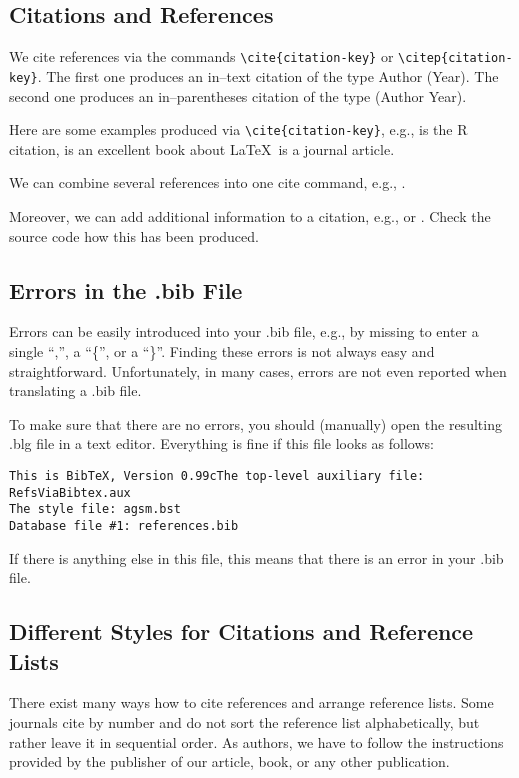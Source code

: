 \documentclass[12pt]{article}
\begin{document}
\subsection{Citations and References}

We cite references via the commands \verb|\cite{citation-key}|
or \verb|\citep{citation-key}|. The first one produces
an in--text citation of the type Author (Year). The second one
produces an in--parentheses citation of the type (Author Year).

Here are some examples produced via \verb|\cite{citation-key}|,
e.g., \cite{R} is the R citation,
\cite{Lamport85} is an excellent book about \LaTeX\, \cite{RF} is
a journal article.

We can combine several references into one cite command, e.g.,
\citep{R,Lamport85,RF}.

Moreover, we can add additional information to a citation, e.g.,
\citep[p.~5]{RF} or \citep[see for example][p.~5]{RF}.
Check the source code how this has been produced.

\subsection{Errors in the .bib File}

Errors can be easily introduced into your .bib file, e.g., by missing to
enter a single ``,'', a ``\{'', or a ``\}''. Finding these errors is not
always easy and straightforward. Unfortunately, in many cases,
errors are not even reported when translating a .bib file.

To make sure that there are no errors, you should (manually)
open the resulting .blg file in a text editor. Everything
is fine if this file looks as follows:
\begin{verbatim}
This is BibTeX, Version 0.99cThe top-level auxiliary file: RefsViaBibtex.aux
The style file: agsm.bst
Database file #1: references.bib
\end{verbatim}

If there is anything else in this file, this means that there is an 
error in your .bib file.

\subsection{Different Styles for Citations and Reference Lists}

There exist many ways how to cite references and arrange reference lists.
Some journals cite by number and do not sort the reference list 
alphabetically, but rather leave it in sequential order. As authors,
we have to follow the instructions provided by the publisher
of our article, book, or any other publication.
\end{document}

